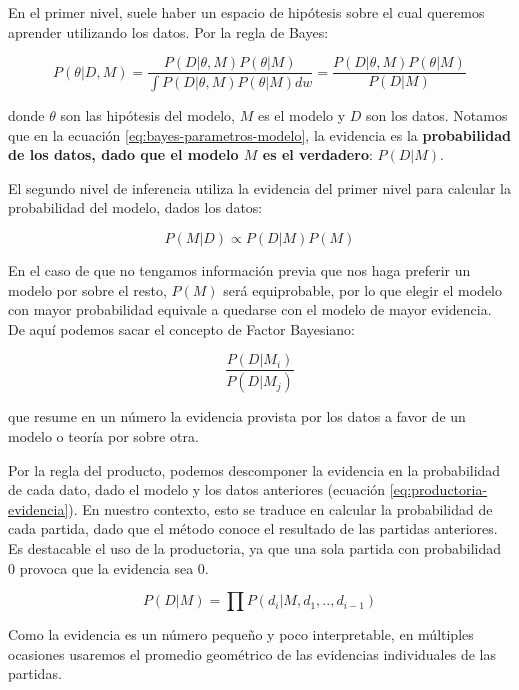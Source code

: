 \documentclass[a4paper,10pt]{report}
\begin{document}
En el primer nivel, suele haber un espacio de hip\'otesis sobre el cual queremos aprender utilizando los datos.
Por la regla de Bayes:

\begin{equation}\label{eq:bayes-parametros-modelo}
	P(\theta | D, M) = \frac{P(D|\theta, M) P(\theta|M)}{\int P(D|\theta, M) P(\theta|M) dw} = \frac{P(D|\theta, M) P(\theta|M)}{P(D|M)}
\end{equation}

donde $\theta$ son las hip\'otesis del modelo, $M$ es el modelo y $D$ son los datos.
Notamos que en la ecuación \ref{eq:bayes-parametros-modelo}, la evidencia es la \textbf{probabilidad de los datos, dado que el modelo $M$ es el verdadero}: $P(D|M)$.

El segundo nivel de inferencia utiliza la evidencia del primer nivel para calcular la probabilidad del modelo, dados los datos:

\begin{equation}\label{eq:bayes-modelos}
	P(M | D) \propto P(D|M) P(M)
\end{equation}

En el caso de que no tengamos informaci\'on previa que nos haga preferir un modelo por sobre el resto, $P(M)$ ser\'a equiprobable, por lo que elegir el modelo con mayor probabilidad equivale a quedarse con el modelo de mayor evidencia.
De aqu\'i podemos sacar el concepto de Factor Bayesiano\cite{kass1995-bayesFactors}:

\begin{equation}
	\frac{P(D|M_i)}{P(D|M_j)}
\end{equation}

que resume en un n\'umero la evidencia provista por los datos a favor de un modelo o teor\'ia por sobre otra.

Por la regla del producto, podemos descomponer la evidencia en la probabilidad de cada dato, dado el modelo y los datos anteriores (ecuación \ref{eq:productoria-evidencia}).
En nuestro contexto, esto se traduce en calcular la probabilidad de cada partida, dado que el método conoce el resultado de las partidas anteriores.
Es destacable el uso de la productoria, ya que una sola partida con probabilidad 0 provoca que la evidencia sea 0.

\begin{equation}\label{eq:productoria-evidencia}
	P(D|M) = \prod P(d_i|M, d_{1}, .., d_{i-1})
\end{equation}

Como la evidencia es un número pequeño y poco interpretable, en múltiples ocasiones usaremos el promedio geométrico de las evidencias individuales de las partidas.
\end{document}
